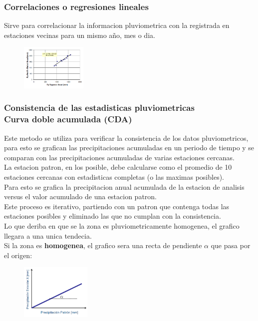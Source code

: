 \subsubsection{Correlaciones o regresiones lineales}

Sirve para correlacionar la informacion pluviometrica con la registrada en estaciones vecinas para un mismo año, mes o dia.\\

\begin{figure}[H]
    \centering
    \includegraphics[width=0.28\textwidth]{imagenes/correlacion_anual.png}
    \label{correlacion}
\end{figure}

\subsubsection{Consistencia de las estadisticas pluviometricas \\ Curva doble acumulada (CDA)}

Este metodo se utiliza para verificar la consistencia de los datos pluviometricos, para esto se grafican las precipitaciones acumuladas en un periodo de tiempo y se comparan con las precipitaciones acumuladas de varias estaciones cercanas.\\

La estacion patron, en los posible, debe calcularse como el promedio de 10 estaciones cercanas con estadisticas completas (o las maximas posibles).\\

Para esto se grafica la precipitacion anual acumulada de la estacion de analisis versus el valor acumulado de una estacion patron.\\

Este proceso es iterativo, partiendo con un patron que contenga todas las estaciones posibles y eliminado las que no cumplan con la consistencia.\\

Lo que deriba en que se la zona es pluviometricamente homogenea, el grafico llegara a una unica tendecia.\\

Si la zona es \textbf{homogenea}, el grafico sera una recta de pendiente $\alpha$ que pasa por el origen: \\
\begin{figure}[H]
    \centering
    \includegraphics[width=0.3\textwidth]{imagenes/cda_homo.png}
    \label{cda_homo}
\end{figure}

